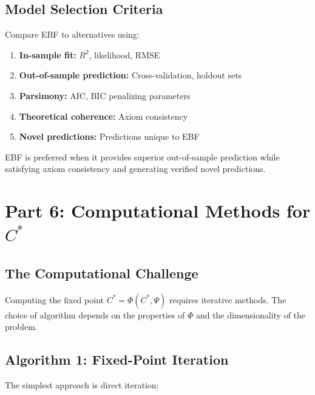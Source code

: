 \subsection{Model Selection Criteria}

\begin{tcolorbox}[colback=yellow!5!white, colframe=yellow!75!black,
    title=Result AZ-I2: Model Selection Protocol]
Compare EBF to alternatives using:
\begin{enumerate}
\item \textbf{In-sample fit:} $R^2$, likelihood, RMSE
\item \textbf{Out-of-sample prediction:} Cross-validation, holdout sets
\item \textbf{Parsimony:} AIC, BIC penalizing parameters
\item \textbf{Theoretical coherence:} Axiom consistency
\item \textbf{Novel predictions:} Predictions unique to EBF
\end{enumerate}

EBF is preferred when it provides superior out-of-sample prediction
while satisfying axiom consistency and generating verified novel predictions.
\end{tcolorbox}


\section{Part 6: Computational Methods for $C^*$}
\label{sec:az-computation}

\subsection{The Computational Challenge}

Computing the fixed point $C^* = \Phi(C^*, \Psi)$ requires iterative methods.
The choice of algorithm depends on the properties of $\Phi$ and the
dimensionality of the problem.

\subsection{Algorithm 1: Fixed-Point Iteration}

The simplest approach is direct iteration:

